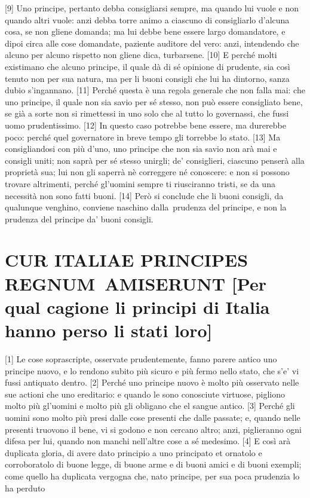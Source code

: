 {[}9{]} Uno principe, pertanto debba consigliarsi sempre, ma quando lui
vuole e non quando altri vuole: anzi debba torre animo a ciascuno di
consigliarlo d'alcuna cosa, se non gliene domanda; ma lui debbe bene
essere largo domandatore, e dipoi circa alle cose domandate, paziente
auditore del vero: anzi, intendendo che alcuno per alcuno rispetto non
gliene dica, turbarsene. {[}10{]} E perché molti existimano che alcuno
principe, il quale dà di sé opinione di prudente, sia così tenuto non
per sua natura, ma per li buoni consigli che lui ha dintorno, sanza
dubio s'ingannano. {[}11{]} Perché questa è una regola generale che non
falla mai: che uno principe, il quale non sia savio per sé stesso, non
può essere consigliato bene, se già a sorte non si rimettessi in uno
solo che al tutto lo governassi, che fussi uomo prudentissimo. {[}12{]}
In questo caso potrebbe bene essere, ma durerebbe poco: perché quel
governatore in breve tempo gli torrebbe lo stato. {[}13{]} Ma
consigliandosi con più d'uno, uno principe che non sia savio non arà mai
e consigli uniti; non saprà per sé stesso unirgli; de' consiglieri,
ciascuno penserà alla proprietà sua; lui non gli saperrà nè correggere
né conoscere: e non si possono trovare altrimenti, perché gl'uomini
sempre ti riusciranno tristi, se da una necessità non sono fatti buoni.
{[}14{]} Però si conclude che li buoni consigli, da qualunque venghino, conviene naschino dalla~prudenza del principe, e non la prudenza del principe da' buoni consigli.

\quebra\section{CUR ITALIAE PRINCIPES REGNUM~AMISERUNT\break
{[}Per qual cagione li principi di Italia hanno perso li stati loro{]}}

{[}1{]} Le cose soprascripte, osservate prudentemente, fanno parere
antico uno principe nuovo, e lo rendono subito più sicuro e più fermo
nello stato, che s'e' vi fussi antiquato dentro. {[}2{]} Perché uno
principe nuovo è molto più osservato nelle sue actioni che uno
ereditario: e quando le sono conosciute virtuose, pigliono molto più
gl'uomini e molto più gli obligano che el sangue antico. {[}3{]} Perché
gli uomini sono molto più presi dalle cose presenti che dalle passate;
e, quando nelle presenti truovono il bene, vi si godono e non cercano
altro; anzi, piglieranno ogni difesa per lui, quando non manchi
nell'altre cose a sé medesimo. {[}4{]} E così arà duplicata gloria, di
avere dato principio a uno principato et ornatolo e corroboratolo di
buone legge, di buone arme e di buoni amici e di buoni exempli; come
quello ha duplicata vergogna che, nato principe, per sua poca prudenzia
lo ha perduto

